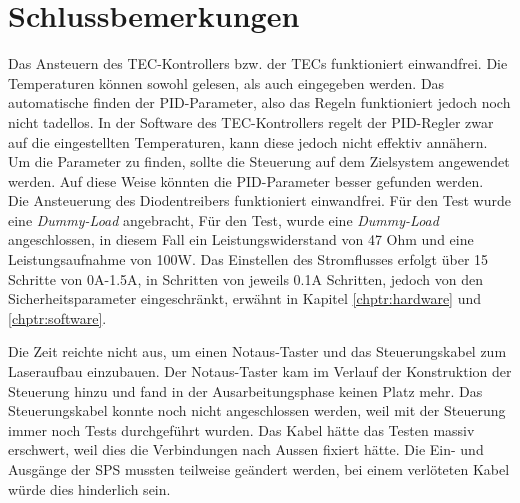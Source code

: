 \section{Schlussbemerkungen}
Das Ansteuern des TEC-Kontrollers bzw. der TECs funktioniert einwandfrei. Die Temperaturen können sowohl gelesen, als auch eingegeben werden. Das automatische finden der PID-Parameter, also das Regeln funktioniert jedoch noch nicht tadellos. In der Software des TEC-Kontrollers regelt der PID-Regler zwar auf die eingestellten Temperaturen, kann diese jedoch nicht effektiv annähern. Um die Parameter zu finden, sollte die Steuerung auf dem Zielsystem angewendet werden. Auf diese Weise könnten die PID-Parameter besser gefunden werden.\\

Die Ansteuerung des Diodentreibers funktioniert einwandfrei. Für den Test wurde eine \textit{Dummy-Load} angebracht,  Für den Test, wurde eine \textit{Dummy-Load}  angeschlossen, in diesem Fall ein Leistungswiderstand von 47 Ohm und eine Leistungsaufnahme von 100W. Das Einstellen des Stromflusses erfolgt über 15 Schritte von 0A-1.5A, in Schritten von jeweils 0.1A Schritten, jedoch von den Sicherheitsparameter eingeschränkt, erwähnt in Kapitel \ref{chptr:hardware} und \ref{chptr:software}.


Die Zeit reichte nicht aus, um einen Notaus-Taster und das Steuerungskabel zum Laseraufbau einzubauen. Der Notaus-Taster kam im Verlauf der Konstruktion der Steuerung hinzu und fand in der Ausarbeitungsphase keinen Platz mehr. Das Steuerungskabel konnte noch nicht angeschlossen werden, weil mit der Steuerung immer noch Tests durchgeführt wurden. Das Kabel hätte das Testen massiv erschwert, weil dies die Verbindungen nach Aussen fixiert hätte. Die Ein- und Ausgänge der SPS mussten teilweise geändert werden, bei einem verlöteten Kabel würde dies hinderlich sein.\\

